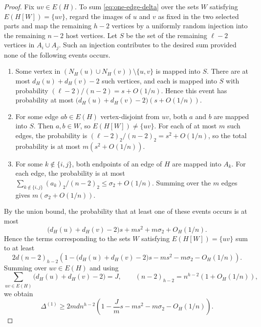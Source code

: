\documentclass[11pt]{article}
\numberwithin{equation}{section}
\theoremstyle{definition}
\theoremstyle{remark}
\begin{document}
\begin{proof}
Fix $uv\in E(H)$. To sum \eqref{eq:one-edge-delta} over the sets $W$ satisfying $E(H[W])=\{uv\}$, regard the images of $u$ and $v$ as fixed in the two selected parts and map the remaining $h-2$ vertices by a uniformly random injection into the remaining $n-2$ host vertices. Let $S$ be the set of the remaining $\ell-2$ vertices in $A_i\cup A_j$. Such an injection contributes to the desired sum provided none of the following events occurs.
\begin{enumerate}
\renewcommand{\labelenumi}{(\roman{enumi})}
\item Some vertex in $(N_H(u)\cup N_H(v))\setminus\{u,v\}$ is mapped into $S$. There are at most $d_H(u)+d_H(v)-2$ such vertices, and each is mapped into $S$ with probability $(\ell-2)/(n-2)=s+O(1/n)$. Hence this event has probability at most $\bigl(d_H(u)+d_H(v)-2\bigr)(s+O(1/n))$.
\item For some edge $ab\in E(H)$ vertex-disjoint from $uv$, both $a$ and $b$ are mapped into $S$. Then $a,b\in W$, so $E(H[W])\ne\{uv\}$. For each of at most $m$ such edges, the probability is $(\ell-2)_2/(n-2)_2=s^2+O(1/n)$, so the total probability is at most $m(s^2+O(1/n))$.
\item For some $k\notin\{i,j\}$, both endpoints of an edge of $H$ are mapped into $A_k$. For each edge, the probability is at most $\sum_{k\notin\{i,j\}}(a_k)_2/(n-2)_2\le \sigma_2+O(1/n)$. Summing over the $m$ edges gives $m(\sigma_2+O(1/n))$.
\end{enumerate}
By the union bound, the probability that at least one of these events occurs is at most
\[
\bigl(d_H(u)+d_H(v)-2\bigr)s+ms^2+m\sigma_2+O_H(1/n).
\]
Hence the terms corresponding to the sets $W$ satisfying $E(H[W])=\{uv\}$ sum to at least
\[
2d(n-2)_{h-2}
\left(1-\bigl(d_H(u)+d_H(v)-2\bigr)s-ms^2-m\sigma_2-O_H(1/n)\right).
\]
Summing over $uv\in E(H)$ and using
\[
\sum_{uv\in E(H)}\bigl(d_H(u)+d_H(v)-2\bigr)=J,
\qquad
(n-2)_{h-2}=n^{h-2}(1+O_H(1/n)),
\]
we obtain
\begin{equation}
\label{eq:balancing-one-edge}
\Delta^{(1)}
\ge 2mdn^{h-2}\left(1-\frac{J}{m}s-ms^2-m\sigma_2-O_H(1/n)\right).
\end{equation}


\end{proof}
\end{document}
